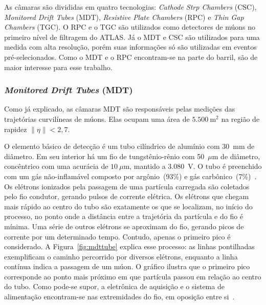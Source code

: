 As câmaras são divididas em quatro tecnologias: \emph{Cathode Strp Chambers}
(CSC), \emph{Monitored Drift Tubes} (MDT), \emph{Resistive Plate Chambers}
(RPC) e \emph{Thin Gap Chambers} (TGC). O RPC e o TGC são utilizados como
detectores de múons no primeiro nível de filtragem do ATLAS. Já o MDT e CSC são
utilizados para uma medida com alta resolução, porém suas informações só são
utilizadas em eventos pré-selecionados. Como o MDT e o RPC encontram-se na
parte do barril, são de maior interesse para esse trabalho.


\subsubsection*{\emph{Monitored Drift Tubes} (MDT)}

Como já explicado, as câmaras  MDT são responsáveis  pelas medições das
trajetórias curvilíneas de múons. Elas ocupam uma área de $5.500~\text{m}^2$ na região de
rapidez $\|\eta\|<2,7$.

O elemento básico de detecção é um tubo cilíndrico de alumínio com 30~mm de
diâmetro. Em seu interior há um fio de tungstênio-rênio com 50~$\mu$m de
diâmetro, concêntrico com uma acurácia de $10~\mu$m, mantido a 3.080~V. O tubo é
preenchido com um gás não-inflamável composto por argônio~(93\%) e gás
carbônico~(7\%)~\cite{RIEGLER2000}. Os elétrons ionizados pela passagem de uma
partícula carregada são coletados pelo fio condutor, gerando pulsos de corrente
elétrica. Os elétrons que chegam mais rápido ao centro do tubo são exatamente os
que se localizam, no início do processo, no ponto onde a distância entre a
trajetória da partícula e do fio é mínima. Uma série de outros elétrons se
aproximam do fio, gerando picos de corrente por um determinado tempo. Contudo,
apenas o primeiro pico é considerado. A Figura~\ref{fig:mdttube} explica esse
processo: as linhas pontilhadas exemplificam o caminho percorrido por diversos
elétrons, enquanto a linha contínua indica a passagem de um múon.  O gráfico
ilustra que o primeiro pico corresponde ao ponto mais próximo em que partícula
passou em relação ao centro do tubo. Como pode-se supor, a eletrônica de
aquisição e o sistema de alimentação encontram-se nas extremidades do fio, em
oposição entre si~\cite{ATLAS2008}.


